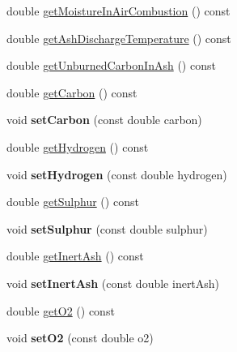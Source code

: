 \begin{DoxyCompactItemize}
double \hyperlink{class_solid_liquid_flue_gas_material_ae3d9780851b8217ed2885753f11ec18b}{get\+Moisture\+In\+Air\+Combustion} () const
\item 
double \hyperlink{class_solid_liquid_flue_gas_material_ab233d4e27397cc74fbe2d3084e4e6f7c}{get\+Ash\+Discharge\+Temperature} () const
\item 
double \hyperlink{class_solid_liquid_flue_gas_material_a53ac34a949168a35297ab3afb9eb2c7b}{get\+Unburned\+Carbon\+In\+Ash} () const
\item 
double \hyperlink{class_solid_liquid_flue_gas_material_a7b8a98111943d30094e2d6950f7f2ec1}{get\+Carbon} () const
\item 
\mbox{\label{class_solid_liquid_flue_gas_material_ab89eddf949fefcc1ade049233c2dc12b}} 
void {\bfseries set\+Carbon} (const double carbon)
\item 
double \hyperlink{class_solid_liquid_flue_gas_material_a26af2edd53c50b071648d03bc6442fb6}{get\+Hydrogen} () const
\item 
\mbox{\label{class_solid_liquid_flue_gas_material_a44788e445519bb719a8ff9ca04702e21}} 
void {\bfseries set\+Hydrogen} (const double hydrogen)
\item 
double \hyperlink{class_solid_liquid_flue_gas_material_abe35d8ff283bfa5aadcf00f9906025ae}{get\+Sulphur} () const
\item 
\mbox{\label{class_solid_liquid_flue_gas_material_a34e4eaeb424bcf02dc29a5ab98172ef5}} 
void {\bfseries set\+Sulphur} (const double sulphur)
\item 
double \hyperlink{class_solid_liquid_flue_gas_material_a0549b32b7b5423267d5f59cc96b98127}{get\+Inert\+Ash} () const
\item 
\mbox{\label{class_solid_liquid_flue_gas_material_a75a066ed50d810d5699fd53cb4376dc8}} 
void {\bfseries set\+Inert\+Ash} (const double inert\+Ash)
\item 
double \hyperlink{class_solid_liquid_flue_gas_material_a08d588e576f605d3f9925cb649e1105e}{get\+O2} () const
\item 
\mbox{\label{class_solid_liquid_flue_gas_material_afb57fdbeeccdb58fffec6d6446891409}} 
void {\bfseries set\+O2} (const double o2)

\end{DoxyCompactItemize}
